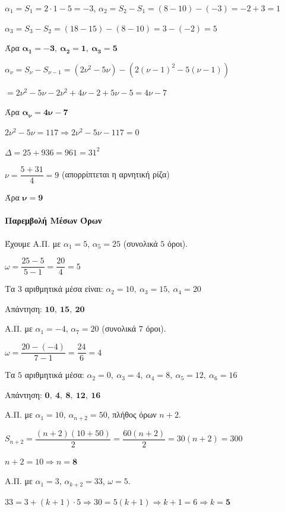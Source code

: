 \documentclass[11pt,a4paper,modern]{FFExercises}
\begin{document}
\lysh[25]
\begin{alist}
\item $\alpha_1=S_1=2\cdot 1-5=-3$, \quad $\alpha_2=S_2-S_1=(8-10)-(-3)=-2+3=1$

$\alpha_3=S_3-S_2=(18-15)-(8-10)=3-(-2)=5$

Άρα $\boldsymbol{\alpha_1=-3,\ \alpha_2=1,\ \alpha_3=5}$

\item $\alpha_{\nu}=S_{\nu}-S_{\nu-1}=(2\nu^2-5\nu)-(2(\nu-1)^2-5(\nu-1))$

$=2\nu^2-5\nu-2\nu^2+4\nu-2+5\nu-5=4\nu-7$

Άρα $\boldsymbol{\alpha_{\nu}=4\nu-7}$

\item $2\nu^2-5\nu=117 \Rightarrow 2\nu^2-5\nu-117=0$

$\varDelta=25+936=961=31^2$

$\nu=\dfrac{5+31}{4}=9$ \quad (απορρίπτεται η αρνητική ρίζα)

Άρα $\boldsymbol{\nu=9}$
\end{alist}

\paragraph{Παρεμβολή Μέσων Όρων}

\lysh[26]
Έχουμε Α.Π. με $\alpha_1=5$, $\alpha_5=25$ (συνολικά $5$ όροι).

$\omega=\dfrac{25-5}{5-1}=\dfrac{20}{4}=5$

Τα $3$ αριθμητικά μέσα είναι: $\alpha_2=10,\ \alpha_3=15,\ \alpha_4=20$

Απάντηση: $\boldsymbol{10,\ 15,\ 20}$

\lysh[27]
Α.Π. με $\alpha_1=-4$, $\alpha_7=20$ (συνολικά $7$ όροι).

$\omega=\dfrac{20-(-4)}{7-1}=\dfrac{24}{6}=4$

Τα $5$ αριθμητικά μέσα: $\alpha_2=0,\ \alpha_3=4,\ \alpha_4=8,\ \alpha_5=12,\ \alpha_6=16$

Απάντηση: $\boldsymbol{0,\ 4,\ 8,\ 12,\ 16}$

\lysh[28]
Α.Π. με $\alpha_1=10$, $\alpha_{n+2}=50$, πλήθος όρων $n+2$.

$S_{n+2}=\dfrac{(n+2)(10+50)}{2}=\dfrac{60(n+2)}{2}=30(n+2)=300$

$n+2=10 \Rightarrow n=\boldsymbol{8}$

\lysh[29]
Α.Π. με $\alpha_1=3$, $\alpha_{k+2}=33$, $\omega=5$.

$33=3+(k+1)\cdot 5 \Rightarrow 30=5(k+1) \Rightarrow k+1=6 \Rightarrow k=\boldsymbol{5}$
\end{document}
